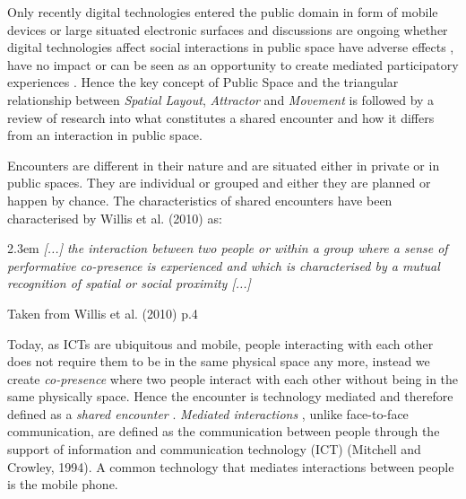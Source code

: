 



Only recently digital technologies entered the public domain in form of mobile devices or large situated electronic surfaces and discussions are ongoing whether digital technologies affect social interactions in public space have adverse effects \cite{Turkle_2012}, have no impact \cite{Hampton_2015} or can be seen as an opportunity to create mediated participatory experiences \cite{Gordon_2011}. Hence the key concept of Public Space and the triangular relationship between \textit{Spatial Layout}, \textit{Attractor} and \textit{Movement} is followed by a review of research into what constitutes a shared encounter and how it differs from an interaction in public space.

Encounters  are different in their nature and are situated either in private or in public spaces. They are individual or grouped and either they are planned or happen by chance. The characteristics of shared encounters have been characterised by Willis et al. (2010) as:


\begin{singlespace}
	\leftskip2.3em
		\rightskip\leftskip
\textit{\small [...] the interaction between two people or within a group where a sense of performative co-presence is experienced and which is characterised by a mutual recognition of spatial or social proximity [...]} 

\small Taken from  Willis et al. (2010) p.4
\end{singlespace}

Today, as ICTs are ubiquitous and mobile, people interacting with each other does not require them to be in the same physical space any more, instead we create \textit{co-presence}  where two people interact with each other without being in the same physically space. Hence the encounter is technology mediated and therefore defined as a \textit{shared encounter} .
\textit{Mediated interactions} , unlike face-to-face communication, are defined as the communication between people through the support of information and communication technology (ICT) (Mitchell and Crowley, 1994). A common technology that mediates interactions between people is the mobile phone.  

